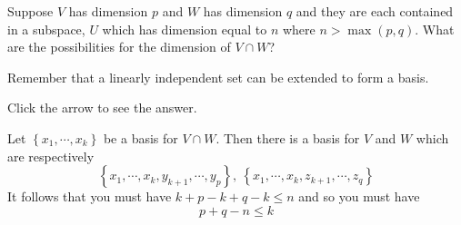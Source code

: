 \documentclass{ximera}
\begin{document}
\begin{problem}\label{prb:5.29} Suppose $V$ has dimension $p$ and $W$ has dimension $q$ and they
are each contained in a subspace, $U$ which has dimension equal to $n$ where
$n>\max \left( p,q\right).$ What are the possibilities for the dimension of
$V\cap W$? 

\begin{hint}
Remember that a linearly independent set can be extended to form a basis.
\end{hint}

Click the arrow to see the answer.
\begin{expandable}
Let $\left\{ x_{1},\cdots ,x_{k}\right\} $ be a
basis for $V\cap W.$ Then there is a basis for $V$ and $W$ which are
respectively
\[
\left\{ x_{1},\cdots ,x_{k},y_{k+1},\cdots ,y_{p}\right\} ,\ \left\{
x_{1},\cdots ,x_{k},z_{k+1},\cdots ,z_{q}\right\}
\]
It follows that you must have $k+p-k+q-k\leq n$ and so you must have
\[
p+q-n\leq k
\]
\end{expandable}
\end{problem}
\end{document}
